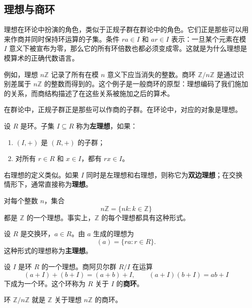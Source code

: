 \subsection{理想与商环}


理想在环论中扮演的角色，类似于正规子群在群论中的角色。它们正是那些可以用来作商并同时保持环运算的子集。条件 $ra\in I$ 和 $ar\in I$ 表示：一旦某个元素在模 $I$ 意义下被宣布为零，那么它的所有环倍数也都必须变成零。这就是为什么理想是模算术的正确代数语言。

例如，理想 $n\mathbb{Z}$ 记录了所有在模 $n$ 意义下应当消失的整数。商环 $\mathbb{Z}/n\mathbb{Z}$ 是通过识别差属于 $n\mathbb{Z}$ 的整数而得到的。这个例子是一般商环的原型：理想编码了我们施加的关系，而商结构描述了在这些关系被施加之后的算术。

在群论中，正规子群正是那些可以作商的子群。在环论中，对应的对象是理想。

\begin{definition}[理想]
设 $R$ 是环。子集 $I\subseteq R$ 称为\textbf{左理想}，如果：
\begin{enumerate}
    \item $(I,+)$ 是 $(R,+)$ 的子群；
    \item 对所有 $r\in R$ 和 $x\in I$，都有 $rx\in I$。
\end{enumerate}
右理想的定义类似。如果 $I$ 同时是左理想和右理想，则称它为\textbf{双边理想}；在交换情形下，通常直接称为\textbf{理想}。
\end{definition}

\begin{example}
对每个整数 $n$，集合
\[
    n\mathbb{Z}=\{nk:k\in\mathbb{Z}\}
\]
都是 $\mathbb{Z}$ 的一个理想。事实上，$\mathbb{Z}$ 的每个理想都具有这种形式。
\end{example}

\begin{definition}[主理想]
设 $R$ 是交换环，$a\in R$。由 $a$ 生成的理想为
\[
    (a)=\{ra:r\in R\}.
\]
这种形式的理想称为\textbf{主理想}。
\end{definition}

\begin{definition}[商环]
设 $I$ 是环 $R$ 的一个理想。商阿贝尔群 $R/I$ 在运算
\[
    (a+I)+(b+I)=(a+b)+I,
    \qquad
    (a+I)(b+I)=ab+I
\]
下成为一个环。这个环称为 $R$ 关于 $I$ 的\textbf{商环}。
\end{definition}

\begin{example}
环 $\mathbb{Z}/n\mathbb{Z}$ 就是 $\mathbb{Z}$ 关于理想 $n\mathbb{Z}$ 的商环。
\end{example}

